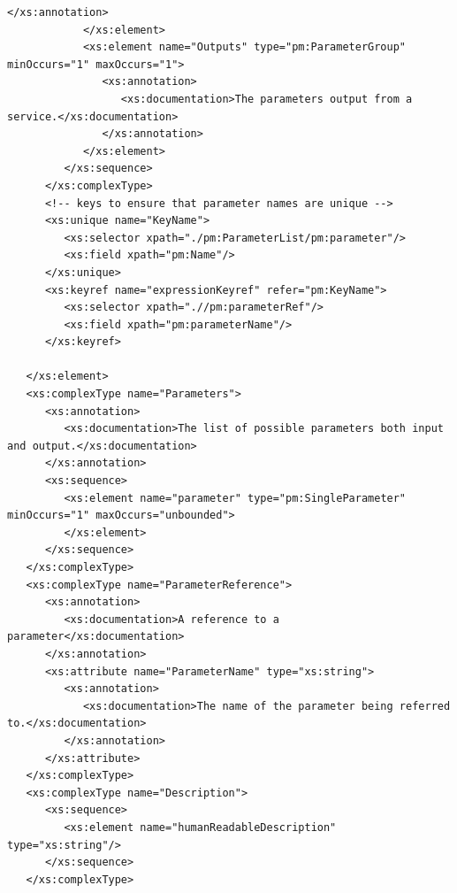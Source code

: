 \documentclass[a4paper,11pt] {ivoa}
\begin{document}
\begin{lstlisting}[style=listXML]
               </xs:annotation>
            </xs:element>
            <xs:element name="Outputs" type="pm:ParameterGroup" minOccurs="1" maxOccurs="1">
               <xs:annotation>
                  <xs:documentation>The parameters output from a service.</xs:documentation>
               </xs:annotation>
            </xs:element>
         </xs:sequence>
      </xs:complexType>
      <!-- keys to ensure that parameter names are unique -->
      <xs:unique name="KeyName">
         <xs:selector xpath="./pm:ParameterList/pm:parameter"/>
         <xs:field xpath="pm:Name"/>
      </xs:unique>
      <xs:keyref name="expressionKeyref" refer="pm:KeyName">
         <xs:selector xpath=".//pm:parameterRef"/>
         <xs:field xpath="pm:parameterName"/>
      </xs:keyref>

   </xs:element>
   <xs:complexType name="Parameters">
      <xs:annotation>
         <xs:documentation>The list of possible parameters both input and output.</xs:documentation>
      </xs:annotation>
      <xs:sequence>
         <xs:element name="parameter" type="pm:SingleParameter" minOccurs="1" maxOccurs="unbounded">
         </xs:element>
      </xs:sequence>
   </xs:complexType>
   <xs:complexType name="ParameterReference">
      <xs:annotation>
         <xs:documentation>A reference to a parameter</xs:documentation>
      </xs:annotation>
      <xs:attribute name="ParameterName" type="xs:string">
         <xs:annotation>
            <xs:documentation>The name of the parameter being referred to.</xs:documentation>
         </xs:annotation>
      </xs:attribute>
   </xs:complexType>
   <xs:complexType name="Description">
      <xs:sequence>
         <xs:element name="humanReadableDescription" type="xs:string"/>
      </xs:sequence>
   </xs:complexType>


\end{lstlisting}
\end{document}
